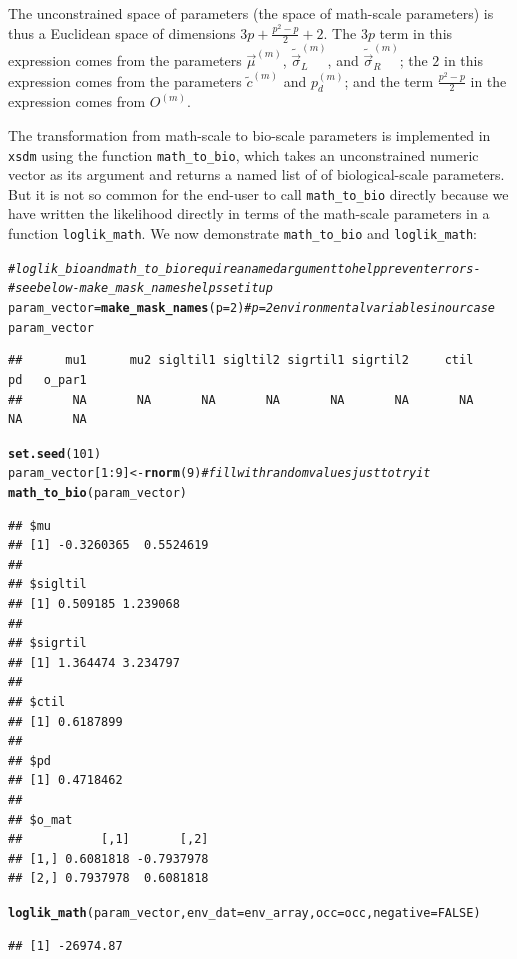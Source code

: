 \documentclass[11pt]{article}\usepackage[]{graphicx}\usepackage[]{xcolor}
\makeatletter
\newcommand{\hlnum}[1]{\textcolor[rgb]{0.686,0.059,0.569}{#1}}%
\newcommand{\hlcom}[1]{\textcolor[rgb]{0.678,0.584,0.686}{\textit{#1}}}%
\newcommand{\hlopt}[1]{\textcolor[rgb]{0,0,0}{#1}}%
\newcommand{\hldef}[1]{\textcolor[rgb]{0.345,0.345,0.345}{#1}}%
\newcommand{\hlkwb}[1]{\textcolor[rgb]{0.69,0.353,0.396}{#1}}%
\newcommand{\hlkwc}[1]{\textcolor[rgb]{0.333,0.667,0.333}{#1}}%
\newcommand{\hlkwd}[1]{\textcolor[rgb]{0.737,0.353,0.396}{\textbf{#1}}}%
\newenvironment{kframe}{%
 \def\at@end@of@kframe{}%
 \ifinner\ifhmode%
  \def\at@end@of@kframe{\end{minipage}}%
  \begin{minipage}{\columnwidth}%
 \fi\fi%
 \def\FrameCommand##1{\hskip\@totalleftmargin \hskip-\fboxsep
 \colorbox{shadecolor}{##1}\hskip-\fboxsep
     \hskip-\linewidth \hskip-\@totalleftmargin \hskip\columnwidth}%
 \MakeFramed {\advance\hsize-\width
   \@totalleftmargin\z@ \linewidth\hsize
   \@setminipage}}%
 {\par\unskip\endMakeFramed%
 \at@end@of@kframe}
\newenvironment{knitrout}{}{} %
\makeatother
\begin{document}
The unconstrained space of parameters (the space of math-scale parameters) 
is thus a Euclidean space of dimensions $3p+\frac{p^2-p}{2}+2$. 
The $3p$ term in this expression comes from the parameters $\vec{\mu}^{(m)}$,
$\tilde{\vec{\sigma}}_L^{(m)}$, and $\tilde{\vec{\sigma}}_R^{(m)}$;
the $2$ in this expression comes from the parameters $\tilde{c}^{(m)}$ and
$p_d^{(m)}$; and the term $\frac{p^2-p}{2}$ in the expression comes from
$O^{(m)}$.

The transformation from math-scale to bio-scale parameters is implemented
in \texttt{xsdm} using the function \texttt{math\_to\_bio}, which takes an unconstrained
numeric vector as its argument and returns a named list of of biological-scale
parameters. But it is not so common for the end-user to call \texttt{math\_to\_bio}
directly because we have written the likelihood directly in terms of the math-scale
parameters in a function \texttt{loglik\_math}. We now demonstrate \texttt{math\_to\_bio}
and \texttt{loglik\_math}:
\begin{knitrout}
\color{fgcolor}\begin{kframe}
\begin{alltt}
\hlcom{#loglik_bio and math_to_bio require a named argument to help prevent errors - }
\hlcom{#see below - make_mask_names helps set it up}
\hldef{param_vector} \hlkwb{=} \hlkwd{make_mask_names}\hldef{(}\hlkwc{p} \hldef{=} \hlnum{2}\hldef{)} \hlcom{#p = 2 environmental variables in our case}
\hldef{param_vector}
\end{alltt}
\begin{verbatim}
##      mu1      mu2 sigltil1 sigltil2 sigrtil1 sigrtil2     ctil       pd   o_par1 
##       NA       NA       NA       NA       NA       NA       NA       NA       NA
\end{verbatim}
\begin{alltt}
\hlkwd{set.seed}\hldef{(}\hlnum{101}\hldef{)}
\hldef{param_vector[}\hlnum{1}\hlopt{:}\hlnum{9}\hldef{]} \hlkwb{<-}  \hlkwd{rnorm}\hldef{(}\hlnum{9}\hldef{)} \hlcom{#fill with random values just to try it}
\hlkwd{math_to_bio}\hldef{(param_vector)}
\end{alltt}
\begin{verbatim}
## $mu
## [1] -0.3260365  0.5524619
## 
## $sigltil
## [1] 0.509185 1.239068
## 
## $sigrtil
## [1] 1.364474 3.234797
## 
## $ctil
## [1] 0.6187899
## 
## $pd
## [1] 0.4718462
## 
## $o_mat
##           [,1]       [,2]
## [1,] 0.6081818 -0.7937978
## [2,] 0.7937978  0.6081818
\end{verbatim}
\begin{alltt}
\hlkwd{loglik_math}\hldef{(param_vector,} \hlkwc{env_dat} \hldef{= env_array,} \hlkwc{occ} \hldef{= occ,} \hlkwc{negative} \hldef{=} \hlnum{FALSE}\hldef{)}
\end{alltt}
\begin{verbatim}
## [1] -26974.87
\end{verbatim}
\end{kframe}
\end{knitrout}
\end{document}
